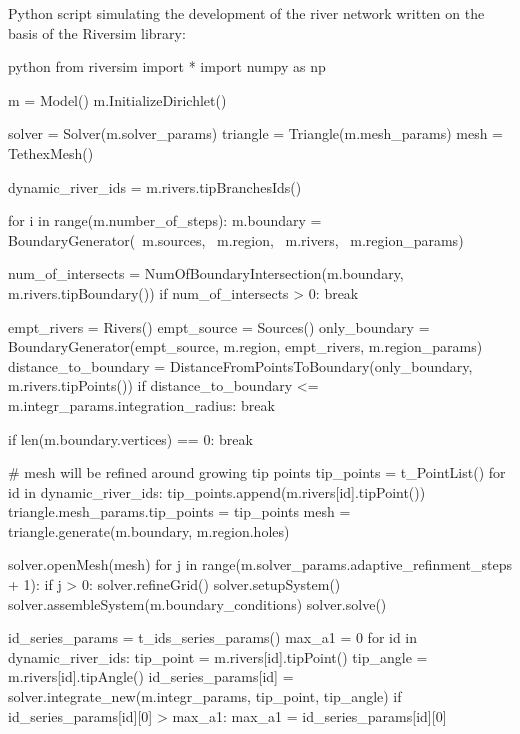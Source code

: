 \documentclass[]{pracamgr}
\begin{document}
    Python script simulating the development of the river network written on the basis of the Riversim library:

    \begin{mintedbox}{python} 
      from riversim import *
      import numpy as np

      m = Model()
      m.InitializeDirichlet()

      solver = Solver(m.solver_params)
      triangle = Triangle(m.mesh_params)
      mesh = TethexMesh()

      dynamic_river_ids = m.rivers.tipBranchesIds()

      for i in range(m.number_of_steps):
          m.boundary = BoundaryGenerator(\
              m.sources, \
              m.region, \
              m.rivers, \
              m.region_params)

          num_of_intersects = NumOfBoundaryIntersection(m.boundary, m.rivers.tipBoundary())
          if num_of_intersects > 0:
              break

          empt_rivers = Rivers()
          empt_source = Sources()
          only_boundary = BoundaryGenerator(empt_source, m.region, empt_rivers, m.region_params)
          distance_to_boundary = DistanceFromPointsToBoundary(only_boundary, m.rivers.tipPoints())
          if distance_to_boundary <= m.integr_params.integration_radius:
              break

          if len(m.boundary.vertices) == 0:
              break 

          # mesh will be refined around growing tip points
          tip_points = t_PointList()
          for id in dynamic_river_ids:
              tip_points.append(m.rivers[id].tipPoint())
          triangle.mesh_params.tip_points = tip_points
          mesh = triangle.generate(m.boundary, m.region.holes)
              
          solver.openMesh(mesh)
          for j in range(m.solver_params.adaptive_refinment_steps + 1):
              if j > 0:
                  solver.refineGrid()
              solver.setupSystem()
              solver.assembleSystem(m.boundary_conditions)
              solver.solve()

          id_series_params = t_ids_series_params()
          max_a1 = 0
          for id in dynamic_river_ids:
              tip_point = m.rivers[id].tipPoint()
              tip_angle = m.rivers[id].tipAngle()
              id_series_params[id] = solver.integrate_new(m.integr_params, tip_point, tip_angle)
              if id_series_params[id][0] > max_a1:
                  max_a1 = id_series_params[id][0]


\end{mintedbox}
\end{document}
